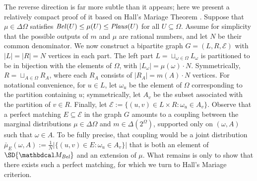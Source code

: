 \begin{subappendices}
\begin{lproof}
    The reverse direction is far more subtle than it appears;
        here we present a relatively compact proof of it based on Hall's
        Mariage Theorem \citep{Hall1935}. 
    Suppose that $\mu \in \Delta \Omega$ satisfies
        $\mathit{Bel}(U) \le \mu(U) \le \mathit{Plaus}(U)$ for all $U \subseteq \Omega$.
    Assume for simplicity that the possible outputs of $m$ and $\mu$ are rational numbers, and let $N$ be their common denominator. 
    We now construct a bipartite graph $G = (L, R, \mathcal E)$ with $|L| = |R| = N$ vertices in each part.
    The left part $L = \sqcup_{\omega \in \Omega} L_\omega$ 
    is partitioned to be in bijection with the elements of $\Omega$, with
        $|L_\omega| = \mu(\omega)\cdot N$. 
    Symmetrically, $R = \sqcup_{A \in \Omega} R_A$, where each $R_A$
        consists of $|R_A| = m(A) \cdot N$ vertices.
    For notational convenience, for $u \in L$, let $\omega_u$ be the element of $\Omega$ corresponding to the partition containing $u$; symmetrically,  let $A_v$ be the subset associated with the partition of $v \in R$. 
    Finally, let $\mathcal E := \{ (u,v) \in L \times R : \omega_u \in A_v\}.$
    Observe that a perfect matching $E \subseteq \mathcal E$ in the graph $G$ amounts to a coupling between the marginal distributions $\mu \in \Delta\Omega$ and $m \in \Delta(2^\Omega)$, supported only on $(\omega, A)$ such that $\omega \in A$.
    To be fully precise, that coupling would be a joint distribution $\bar\mu_E(\omega, A) := \frac1N |\{ (u,v) \in E : \omega_u \in A_v \}|$ that is both an element of $\SD{\dg M_\Bel}$ and an extension of $\mu$. 
    What remains is only to show that there exists such a perfect matching, for which we turn to Hall's Mariage criterion.     
    

\end{lproof}
\end{subappendices}
